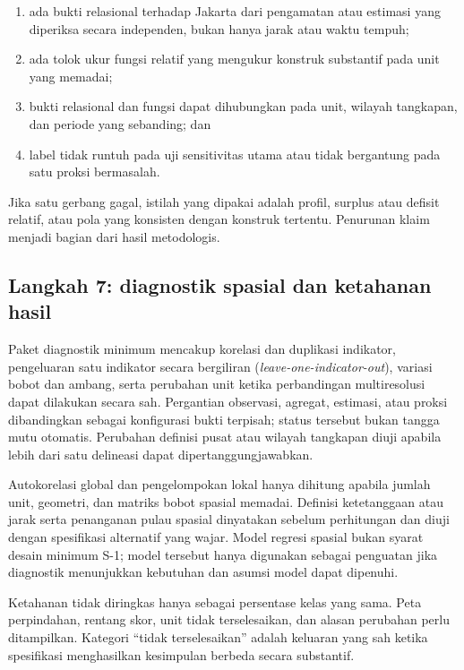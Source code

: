 \documentclass[11pt,a4paper,oneside,openany,indonesian]{report}
\begin{document}
\begin{enumerate}
\def\labelenumi{\arabic{enumi}.}
\tightlist
\item
  ada bukti relasional terhadap Jakarta dari pengamatan atau estimasi
  yang diperiksa secara independen, bukan hanya jarak atau waktu tempuh;
\item
  ada tolok ukur fungsi relatif yang mengukur konstruk substantif pada
  unit yang memadai;
\item
  bukti relasional dan fungsi dapat dihubungkan pada unit, wilayah
  tangkapan, dan periode yang sebanding; dan
\item
  label tidak runtuh pada uji sensitivitas utama atau tidak bergantung
  pada satu proksi bermasalah.
\end{enumerate}

Jika satu gerbang gagal, istilah yang dipakai adalah profil,
surplus atau defisit relatif, atau pola yang konsisten dengan konstruk
tertentu. Penurunan klaim menjadi bagian dari hasil
metodologis.

\subsection{Langkah 7: diagnostik spasial dan ketahanan
hasil}\label{langkah-7-diagnostik-spasial-dan-ketahanan-hasil}

Paket diagnostik minimum mencakup korelasi dan duplikasi indikator,
pengeluaran satu indikator secara bergiliran
(\emph{leave-one-indicator-out}), variasi bobot dan ambang, serta
perubahan unit ketika perbandingan multiresolusi dapat dilakukan secara
sah. Pergantian observasi, agregat, estimasi, atau proksi dibandingkan
sebagai konfigurasi bukti terpisah; status tersebut bukan tangga mutu
otomatis. Perubahan definisi pusat atau wilayah tangkapan diuji apabila
lebih dari satu delineasi dapat dipertanggungjawabkan.

Autokorelasi global dan pengelompokan lokal hanya dihitung apabila
jumlah unit, geometri, dan matriks bobot spasial memadai. Definisi
ketetanggaan atau jarak serta penanganan pulau spasial dinyatakan
sebelum perhitungan dan diuji dengan spesifikasi alternatif yang wajar.
Model regresi spasial bukan syarat desain minimum S-1; model tersebut
hanya digunakan sebagai penguatan jika diagnostik menunjukkan kebutuhan
dan asumsi model dapat dipenuhi.

Ketahanan tidak diringkas hanya sebagai persentase kelas yang sama. Peta
perpindahan, rentang skor, unit tidak terselesaikan, dan alasan
perubahan perlu ditampilkan. Kategori ``tidak terselesaikan'' adalah
keluaran yang sah ketika spesifikasi menghasilkan kesimpulan berbeda
secara substantif.
\end{document}
